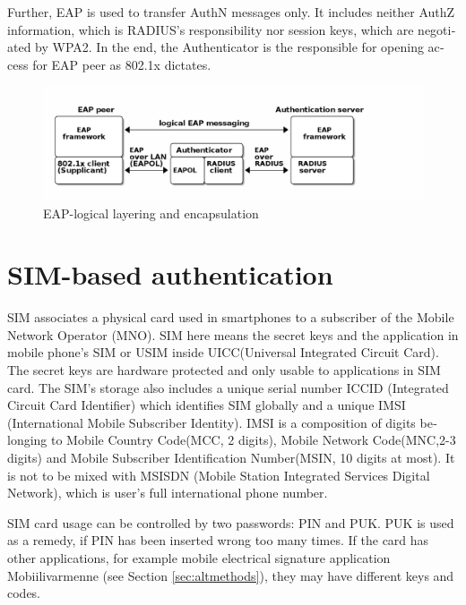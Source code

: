 \documentclass[12pt,a4paper,english]{tutthesis}
\begin{document}
\begin{otherlanguage}{english}
Further, EAP is used to transfer AuthN messages only.
It includes neither AuthZ information, which is RADIUS's
responsibility nor session keys, which are negotiated by WPA2.  In the
end,
the Authenticator is the responsible for opening access for EAP peer as 802.1x
dictates.







\begin{figure}[htb]
\centering
\includegraphics[width=.9\linewidth]{eap-layer.png}
\caption{\label{fig:eap-layers}EAP-logical layering and encapsulation}
\end{figure}



\section{SIM-based authentication}
\label{sec-2-5}
\label{sec:sim-based-auth}
SIM associates a physical card used in smartphones to
a subscriber of the Mobile Network Operator (MNO).
SIM here means the secret keys and the application in mobile phone's
SIM or USIM inside UICC(Universal Integrated Circuit Card).
The secret keys are hardware protected and only usable to applications
in SIM card.
The SIM's storage also includes a unique serial number ICCID 
(Integrated Circuit Card Identifier) which identifies SIM globally
and a unique IMSI (International Mobile Subscriber Identity). IMSI is
a composition of digits belonging to Mobile Country Code(MCC, 2
digits), Mobile Network Code(MNC,2-3 digits) and Mobile Subscriber
Identification Number(MSIN, 10 digits at most).
It is not to be mixed with MSISDN (Mobile Station Integrated Services
Digital Network), which is user's full international phone number.


SIM card usage can be controlled by two passwords: PIN and PUK.  PUK
is used as a remedy, if PIN has been inserted wrong too many times.
If the card has other applications, for example mobile electrical
signature application Mobiilivarmenne (see Section \ref{sec:altmethods}),
they may have different keys and codes.



\end{otherlanguage}
\end{document}
